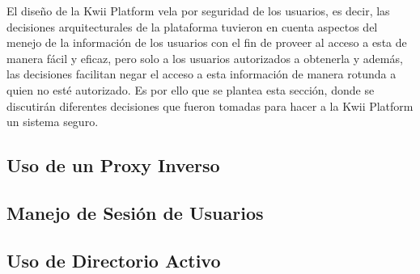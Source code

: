 El diseño de la Kwii Platform vela por seguridad de los usuarios, es decir, las decisiones arquitecturales de la plataforma tuvieron en cuenta aspectos del menejo de la información de los usuarios con el fin de proveer al acceso a esta de manera fácil y eficaz, pero solo a los usuarios autorizados a obtenerla y además, las decisiones facilitan negar el acceso a esta información de manera rotunda a quien no esté autorizado. Es por ello que se plantea esta sección, donde se discutirán diferentes decisiones que fueron tomadas para hacer a la Kwii Platform un sistema seguro.

\subsection{Uso de un Proxy Inverso}

\subsection{Manejo de Sesión de Usuarios}

\subsection{Uso de Directorio Activo}
